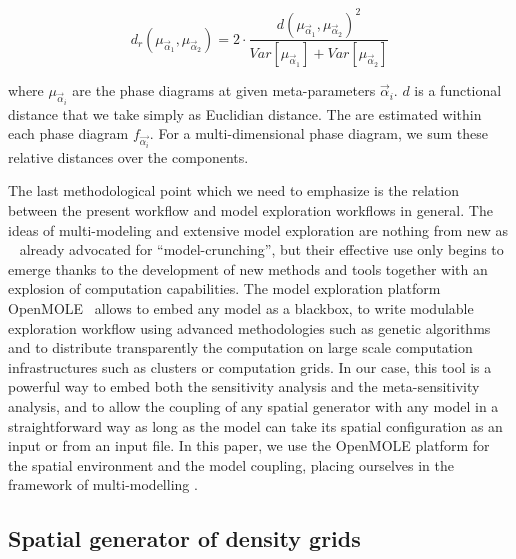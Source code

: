 \documentclass[3p,times,procedia]{elsarticle}
\begin{document}

\begin{equation}\label{eq:phase-distance}
d_r\left(\mu_{\vec{\alpha}_1},\mu_{\vec{\alpha}_2}\right) = 2 \cdot \frac{d(\mu_{\vec{\alpha}_1},\mu_{\vec{\alpha}_2})^2}{Var\left[\mu_{\vec{\alpha}_1}\right] + Var\left[\mu_{\vec{\alpha}_2}\right]}
\end{equation}

where $\mu_{\vec{\alpha}_i}$ are the phase diagrams at given meta-parameters $\vec{\alpha}_i$. $d$ is a functional distance that we take simply as Euclidian distance. The  are estimated  within each phase diagram $f_{\vec{\alpha_i}}$. For a multi-dimensional phase diagram, we sum these relative distances over the components. 

The last methodological point which we need to emphasize is the relation between the present workflow and model exploration workflows in general. The ideas of multi-modeling and extensive model exploration are nothing from new as ~\cite{openshaw1983data} already advocated for ``model-crunching'', but their effective use only begins to emerge thanks to the development of new methods and tools together with an explosion of computation capabilities. The model exploration platform OpenMOLE~\citep{reuillon2013openmole} allows to embed any model as a blackbox, to write modulable exploration workflow using advanced methodologies such as genetic algorithms and to distribute transparently the computation on large scale computation infrastructures such as clusters or computation grids. In our case, this tool is a powerful way to embed both the sensitivity analysis and the meta-sensitivity analysis, and to allow the coupling of any spatial generator with any model in a straightforward way as long as the model can take its spatial configuration as an input or from an input file. In this paper, we use the OpenMOLE platform for the spatial environment and the model coupling, placing ourselves in the  framework of multi-modelling \citep{cottineau2015modular}.


\subsection{Spatial generator of density grids}
\end{document}
